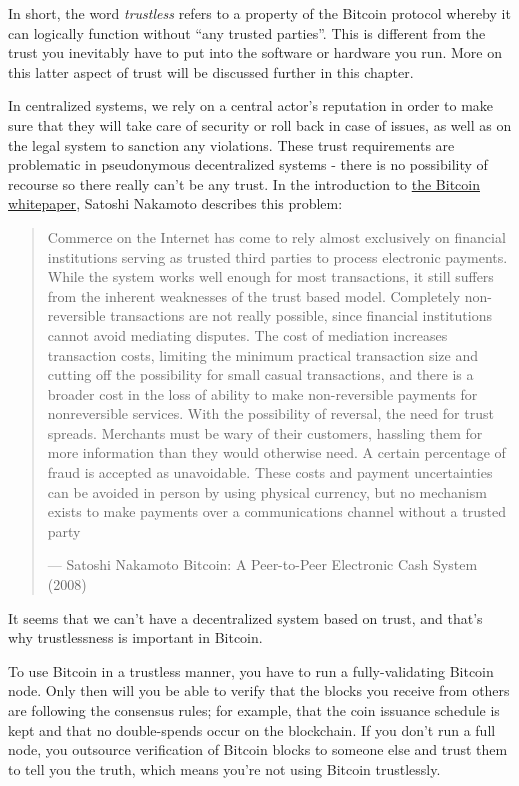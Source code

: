 In short, the word \emph{trustless} refers to a property of the Bitcoin
protocol whereby it can logically function without ``any trusted
parties''. This is different from the trust you inevitably have to put
into the software or hardware you run. More on this latter aspect of
trust will be discussed further in this chapter.

In centralized systems, we rely on a central actor's reputation in order
to make sure that they will take care of security or roll back in case
of issues, as well as on the legal system to sanction any violations.
These trust requirements are problematic in pseudonymous decentralized
systems - there is no possibility of recourse so there really can't be
any trust. In the introduction to
\href{https://bitcoin.org/bitcoin.pdf}{the Bitcoin whitepaper}, Satoshi
Nakamoto describes this problem:

\begin{quote}
Commerce on the Internet has come to rely almost exclusively on
financial institutions serving as trusted third parties to process
electronic payments. While the system works well enough for most
transactions, it still suffers from the inherent weaknesses of the trust
based model. Completely non-reversible transactions are not really
possible, since financial institutions cannot avoid mediating disputes.
The cost of mediation increases transaction costs, limiting the minimum
practical transaction size and cutting off the possibility for small
casual transactions, and there is a broader cost in the loss of ability
to make non-reversible payments for nonreversible services. With the
possibility of reversal, the need for trust spreads. Merchants must be
wary of their customers, hassling them for more information than they
would otherwise need. A certain percentage of fraud is accepted as
unavoidable. These costs and payment uncertainties can be avoided in
person by using physical currency, but no mechanism exists to make
payments over a communications channel without a trusted party

---  Satoshi Nakamoto Bitcoin: A Peer-to-Peer Electronic Cash System
(2008)
\end{quote}

It seems that we can't have a decentralized system based on trust, and
that's why trustlessness is important in Bitcoin.

To use Bitcoin in a trustless manner, you have to run a fully-validating
Bitcoin node. Only then will you be able to verify that the blocks you
receive from others are following the consensus rules; for example, that
the coin issuance schedule is kept and that no double-spends occur on
the blockchain. If you don't run a full node, you outsource verification
of Bitcoin blocks to someone else and trust them to tell you the truth,
which means you're not using Bitcoin trustlessly.

